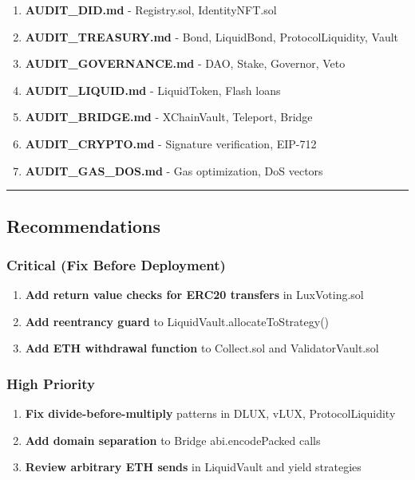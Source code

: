 \documentclass[
]{article}
\providecommand{\tightlist}{%
  \setlength{\itemsep}{0pt}\setlength{\parskip}{0pt}}
\begin{document}
\begin{enumerate}
\def\labelenumi{\arabic{enumi}.}
\tightlist
\item
  \textbf{AUDIT\_DID.md} - Registry.sol, IdentityNFT.sol
\item
  \textbf{AUDIT\_TREASURY.md} - Bond, LiquidBond, ProtocolLiquidity,
  Vault
\item
  \textbf{AUDIT\_GOVERNANCE.md} - DAO, Stake, Governor, Veto
\item
  \textbf{AUDIT\_LIQUID.md} - LiquidToken, Flash loans
\item
  \textbf{AUDIT\_BRIDGE.md} - XChainVault, Teleport, Bridge
\item
  \textbf{AUDIT\_CRYPTO.md} - Signature verification, EIP-712
\item
  \textbf{AUDIT\_GAS\_DOS.md} - Gas optimization, DoS vectors
\end{enumerate}

\begin{center}\rule{0.5\linewidth}{0.5pt}\end{center}

\subsection{Recommendations}\label{recommendations}

\subsubsection{Critical (Fix Before
Deployment)}\label{critical-fix-before-deployment}

\begin{enumerate}
\def\labelenumi{\arabic{enumi}.}
\tightlist
\item
  \textbf{Add return value checks for ERC20 transfers} in LuxVoting.sol
\item
  \textbf{Add reentrancy guard} to LiquidVault.allocateToStrategy()
\item
  \textbf{Add ETH withdrawal function} to Collect.sol and
  ValidatorVault.sol
\end{enumerate}

\subsubsection{High Priority}\label{high-priority}

\begin{enumerate}
\def\labelenumi{\arabic{enumi}.}
\setcounter{enumi}{3}
\tightlist
\item
  \textbf{Fix divide-before-multiply} patterns in DLUX, vLUX,
  ProtocolLiquidity
\item
  \textbf{Add domain separation} to Bridge abi.encodePacked calls
\item
  \textbf{Review arbitrary ETH sends} in LiquidVault and yield
  strategies
\end{enumerate}
\end{document}
